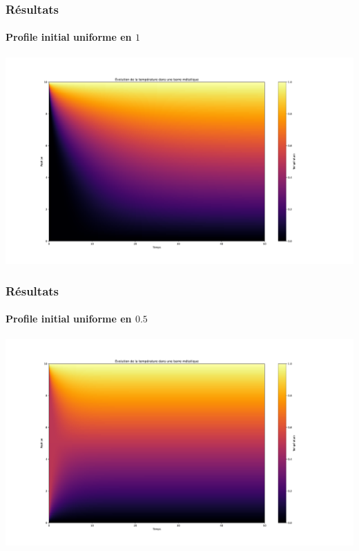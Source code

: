 \documentclass{beamer}
\begin{document}
    \begin{frame}
    \frametitle{Résultats}
    \framesubtitle{Profile initial uniforme en $1$}

    \begin{center}
    \includegraphics[width=1.2\linewidth]{figs/Figure_1.pdf}
    \end{center}


    \end{frame}


    \begin{frame}
    \frametitle{Résultats}
    \framesubtitle{Profile initial uniforme en $0.5$}

    \begin{center}
    \includegraphics[width=1.2\linewidth]{figs/Figure_2.pdf}
    \end{center}


    \end{frame}
\end{document}
